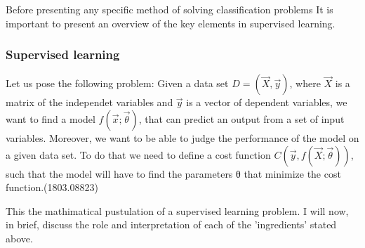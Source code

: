 \documentclass[11pt,a4paper]{article}
\begin{document}
Before presenting any specific method of solving classification problems It is important to present an overview of the key elements in supervised learning.

\subsubsection{Supervised learning}
\label{sec:org527e49c}
Let us pose the following problem:
Given a data set \(D= (\vec{X}, \vec{y})\), where \(\vec{X}\) is a matrix of the independet variables and \(\vec{y}\) is a vector of dependent variables, we want to find a model \(f(\vec{x} ; \vec{\theta})\),  that can predict an output from a set of input variables. Moreover, we  want to be able to judge the performance of the model on a given data set. To do that we need to define a cost function \(C(\vec{y}, f(\vec{X}; \vec{\theta}))\), such that the model will have to find the parameters θ that minimize the cost function.(1803.08823)

This the mathimatical pustulation of a supervised learning problem. I will now, in brief, discuss the role and interpretation of each of the 'ingredients' stated above.
\end{document}
